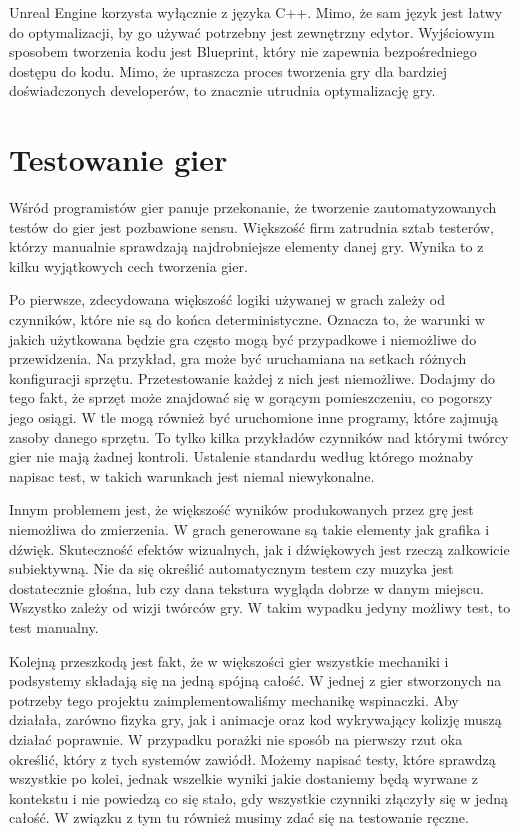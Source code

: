 \documentclass[12pt]{xmgr}
\begin{document}
Unreal Engine korzysta wyłącznie z języka C++. Mimo, że sam język jest łatwy do optymalizacji, by go używać potrzebny jest zewnętrzny edytor. Wyjściowym sposobem tworzenia kodu jest Blueprint, który nie zapewnia bezpośredniego dostępu do kodu. Mimo, że upraszcza proces tworzenia gry dla bardziej doświadczonych developerów, to znacznie utrudnia optymalizację gry.

\chapter{ Testowanie gier}

Wśród programistów gier panuje przekonanie, że tworzenie zautomatyzowanych testów do gier jest pozbawione sensu. Większość firm zatrudnia sztab testerów, którzy manualnie sprawdzają najdrobniejsze elementy danej gry. Wynika to z kilku wyjątkowych cech tworzenia gier.

Po pierwsze, zdecydowana większość logiki używanej w grach zależy od czynników, które nie są do końca deterministyczne. Oznacza to, że warunki w jakich użytkowana będzie gra często mogą być przypadkowe i niemożliwe do przewidzenia. Na przykład, gra może być uruchamiana na setkach różnych konfiguracji sprzętu. Przetestowanie każdej z nich jest niemożliwe. Dodajmy do tego fakt, że sprzęt może znajdować się w gorącym pomieszczeniu, co pogorszy jego osiągi. W tle mogą również być uruchomione inne programy, które zajmują zasoby danego sprzętu. To tylko kilka przykładów czynników nad którymi twórcy gier nie mają żadnej kontroli. Ustalenie standardu według którego możnaby napisac test, w takich warunkach jest niemal niewykonalne.

Innym problemem jest, że większość wyników produkowanych przez grę jest niemożliwa do zmierzenia.
W grach generowane są takie elementy jak grafika i dźwięk.  Skuteczność efektów wizualnych, jak i dźwiękowych jest rzeczą załkowicie subiektywną. Nie da się określić automatycznym testem czy muzyka jest dostatecznie głośna, lub czy dana tekstura wygląda dobrze w danym miejscu. Wszystko zależy od wizji twórców gry. W takim wypadku jedyny możliwy test, to test manualny.

Kolejną przeszkodą jest fakt, że w większości gier wszystkie mechaniki i podsystemy składają się na jedną spójną całość. W jednej z gier stworzonych na potrzeby tego projektu zaimplementowaliśmy mechanikę wspinaczki. Aby działała, zarówno fizyka gry, jak i animacje oraz kod wykrywający kolizję muszą działać poprawnie. W przypadku porażki nie sposób na pierwszy rzut oka określić, który z tych systemów zawiódł. Możemy napisać testy, które sprawdzą wszystkie po kolei, jednak wszelkie wyniki jakie dostaniemy będą wyrwane z kontekstu i nie powiedzą co się stało, gdy wszystkie czynniki złączyły się w jedną całość. W związku z tym tu również musimy zdać się na testowanie ręczne.
\end{document}
